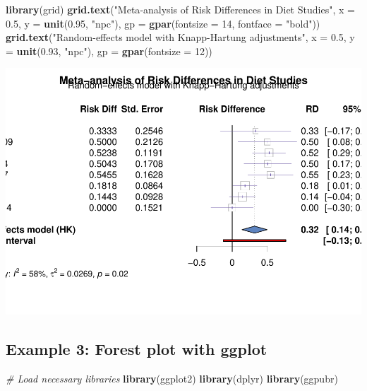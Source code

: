 \documentclass[
]{book}
\newenvironment{Shaded}{\begin{snugshade}}{\end{snugshade}}
\newcommand{\AttributeTok}[1]{\textcolor[rgb]{0.13,0.29,0.53}{#1}}
\newcommand{\CommentTok}[1]{\textcolor[rgb]{0.56,0.35,0.01}{\textit{#1}}}
\newcommand{\DecValTok}[1]{\textcolor[rgb]{0.00,0.00,0.81}{#1}}
\newcommand{\FloatTok}[1]{\textcolor[rgb]{0.00,0.00,0.81}{#1}}
\newcommand{\FunctionTok}[1]{\textcolor[rgb]{0.13,0.29,0.53}{\textbf{#1}}}
\newcommand{\NormalTok}[1]{#1}
\newcommand{\StringTok}[1]{\textcolor[rgb]{0.31,0.60,0.02}{#1}}
\begin{document}
\begin{Shaded}
\begin{Highlighting}[]
\FunctionTok{library}\NormalTok{(grid)}
\FunctionTok{grid.text}\NormalTok{(}\StringTok{"Meta{-}analysis of Risk Differences in Diet Studies"}\NormalTok{, }
          \AttributeTok{x =} \FloatTok{0.5}\NormalTok{, }\AttributeTok{y =} \FunctionTok{unit}\NormalTok{(}\FloatTok{0.95}\NormalTok{, }\StringTok{"npc"}\NormalTok{), }
          \AttributeTok{gp =} \FunctionTok{gpar}\NormalTok{(}\AttributeTok{fontsize =} \DecValTok{14}\NormalTok{, }\AttributeTok{fontface =} \StringTok{"bold"}\NormalTok{))}
\FunctionTok{grid.text}\NormalTok{(}\StringTok{"Random{-}effects model with Knapp{-}Hartung adjustments"}\NormalTok{, }
          \AttributeTok{x =} \FloatTok{0.5}\NormalTok{, }\AttributeTok{y =} \FunctionTok{unit}\NormalTok{(}\FloatTok{0.93}\NormalTok{, }\StringTok{"npc"}\NormalTok{), }
          \AttributeTok{gp =} \FunctionTok{gpar}\NormalTok{(}\AttributeTok{fontsize =} \DecValTok{12}\NormalTok{))}
\end{Highlighting}
\end{Shaded}

\includegraphics{_main_files/figure-latex/unnamed-chunk-29-1.pdf}

\subsection{Example 3: Forest plot with ggplot}\label{example-3-forest-plot-with-ggplot}

\begin{Shaded}
\begin{Highlighting}[]
\CommentTok{\# Load necessary libraries}
\FunctionTok{library}\NormalTok{(ggplot2)}
\FunctionTok{library}\NormalTok{(dplyr)}
\FunctionTok{library}\NormalTok{(ggpubr)}
\end{Highlighting}
\end{Shaded}
\end{document}

